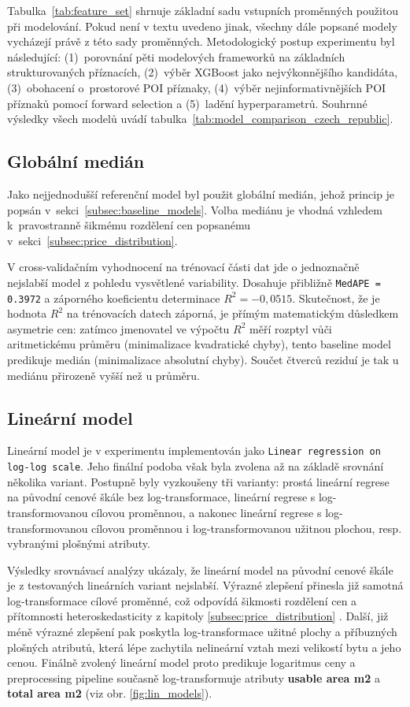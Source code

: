 Tabulka~\ref{tab:feature_set} shrnuje základní sadu vstupních proměnných použitou při modelování. Pokud není v textu uvedeno jinak, všechny dále popsané modely vycházejí právě z této sady proměnných. Metodologický postup experimentu byl následující: (1)~porovnání pěti modelových frameworků na základních strukturovaných příznacích, (2)~výběr XGBoost jako nejvýkonnějšího kandidáta, (3)~obohacení o~prostorové POI příznaky, (4)~výběr nejinformativnějších POI příznaků pomocí forward selection a (5)~ladění hyperparametrů. Souhrnné výsledky všech modelů uvádí tabulka~\ref{tab:model_comparison_czech_republic}.

\subsection*{Globální medián}
Jako nejjednodušší referenční model byl použit globální medián, jehož princip je popsán v~sekci~\ref{subsec:baseline_models}. Volba mediánu je vhodná vzhledem k~pravostranně šikmému rozdělení cen popsanému v~sekci~\ref{subsec:price_distribution}.

V cross-validačním vyhodnocení na trénovací části dat jde o jednoznačně nejslabší model z pohledu vysvětlené variability. Dosahuje přibližně \texttt{MedAPE = 0.3972} a záporného koeficientu determinace \(R^2 = -0{,}0515\). Skutečnost, že je hodnota \(R^2\) na trénovacích datech záporná, je přímým matematickým důsledkem asymetrie cen: zatímco jmenovatel ve výpočtu \(R^2\) měří rozptyl vůči aritmetickému průměru (minimalizace kvadratické chyby), tento baseline model predikuje medián (minimalizace absolutní chyby). Součet čtverců reziduí je tak u mediánu přirozeně vyšší než u průměru.

\subsection*{Lineární model}
Lineární model je v experimentu implementován jako \texttt{Linear regression on log-log scale}. Jeho finální podoba však byla zvolena až na základě srovnání několika variant. Postupně byly vyzkoušeny tři varianty: prostá lineární regrese na původní cenové škále bez log-transformace, lineární regrese s log-transformovanou cílovou proměnnou, a nakonec lineární regrese s log-transformovanou cílovou proměnnou i log-transformovanou užitnou plochou, resp. vybranými plošnými atributy.

Výsledky srovnávací analýzy ukázaly, že lineární model na původní cenové škále je z testovaných lineárních variant nejslabší. Výrazné zlepšení přinesla již samotná log-transformace cílové proměnné, což odpovídá šikmosti rozdělení cen a přítomnosti heteroskedasticity z kapitoly \ref{subsec:price_distribution} . Další, již méně výrazné zlepšení pak poskytla log-transformace užitné plochy a příbuzných plošných atributů, která lépe zachytila nelineární vztah mezi velikostí bytu a jeho cenou. Finálně zvolený lineární model proto predikuje logaritmus ceny a preprocessing pipeline současně log-transformuje atributy \textbf{usable area m2} a \textbf{total area m2} (viz obr. \ref{fig:lin_models}).


